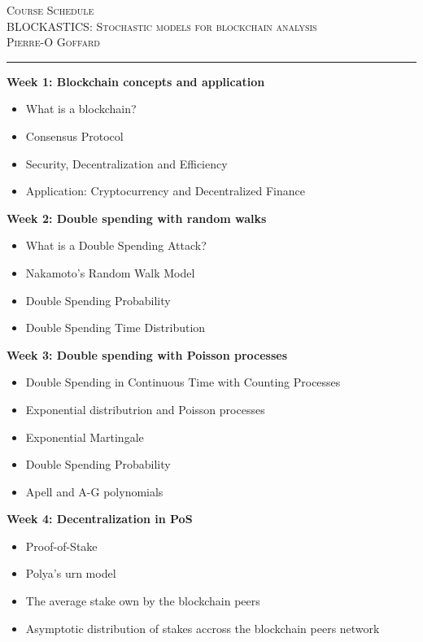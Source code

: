 \documentclass[11pt]{article}
\def\title{Course Schedule}
\def\course{BLOCKASTICS: Stochastic models for blockchain analysis }
\def\profName{Pierre-O Goffard }
\begin{document}
{\center \textsc{\Large \title\\
	\large\course\\
	 \profName %
	}\\
	\vspace*{2em}
	\hrule
\vspace*{2em}}




\noindent \textbf{Week 1: Blockchain concepts and application}\\
\begin{itemize}
	\item What is a blockchain?
	\item Consensus Protocol
	\item Security, Decentralization and Efficiency
	\item Application: Cryptocurrency and Decentralized Finance
\end{itemize}


\noindent \textbf{Week 2: Double spending with random walks}\\

\begin{itemize}
	\item What is a Double Spending Attack?
	\item Nakamoto's Random Walk Model
	\item Double Spending Probability
	\item Double Spending Time Distribution
\end{itemize}


\noindent \textbf{Week 3: Double spending with Poisson processes}\\
\begin{itemize}
	\item Double Spending in Continuous Time with Counting Processes
	\item Exponential distributrion and Poisson processes
	\item Exponential Martingale
	\item Double Spending Probability
	\item Apell and A-G polynomials
\end{itemize}



\noindent \textbf{Week 4: Decentralization in PoS}\\
\begin{itemize}
	\item Proof-of-Stake
	\item Polya's urn model
	\item The average stake own by the blockchain peers
	\item Asymptotic distribution of stakes accross the blockchain peers network
\end{itemize}
\end{document}
